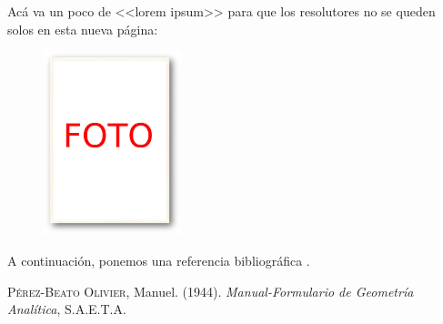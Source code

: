 \documentclass[
	fecha={5 de agosto de 2025},
	palabrasclave={RetoSecundaria, ago2025, álgebra, dif1},
	codigo=minted
]{RetoMatematico}
\begin{document}

Acá va un poco de <<lorem ipsum>> para que los resolutores no se queden solos en esta nueva página:

\begin{figure}
	\vspace{-5mm}
	\centering
	\includegraphics[width=40mm]{imagenes/autor}
	\caption{}
\end{figure}
\lipsum[1-2]

A continuación, ponemos una referencia bibliográfica \cite[véase][p.25]{beato1944}.




\begin{thebibliography}{A}
	
	 \textsc{Pérez-Beato Olivier}, Manuel. (1944). \textit{Manual-Formulario de Geometría Analítica}, S.A.E.T.A.
	
\end{thebibliography}
\end{document}
